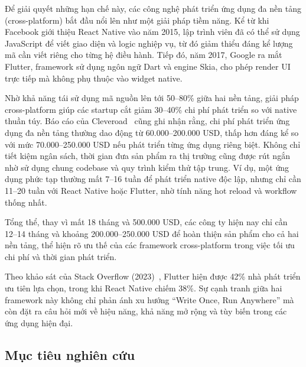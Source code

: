     Để giải quyết những hạn chế này, các công nghệ phát triển ứng dụng đa nền tảng (cross-platform) bắt đầu nổi lên như một giải pháp tiềm năng. Kể từ khi Facebook giới thiệu React Native vào năm 2015, lập trình viên đã có thể sử dụng JavaScript để viết giao diện và logic nghiệp vụ, từ đó giảm thiểu đáng kể lượng mã cần viết riêng cho từng hệ điều hành. Tiếp đó, năm 2017, Google ra mắt Flutter, framework sử dụng ngôn ngữ Dart và engine Skia, cho phép render UI trực tiếp mà không phụ thuộc vào widget native.
\vspace{0.5em}


    Nhờ khả năng tái sử dụng mã nguồn lên tới 50--80\% giữa hai nền tảng, giải pháp cross-platform giúp các startup cắt giảm 30--40\% chi phí phát triển so với native thuần túy. Báo cáo của Cleveroad~\cite{cleveroad} cũng ghi nhận rằng, chi phí phát triển ứng dụng đa nền tảng thường dao động từ 60.000--200.000 USD, thấp hơn đáng kể so với mức 70.000--250.000 USD nếu phát triển từng ứng dụng riêng biệt. Không chỉ tiết kiệm ngân sách, thời gian đưa sản phẩm ra thị trường cũng được rút ngắn nhờ sử dụng chung codebase và quy trình kiểm thử tập trung. Ví dụ, một ứng dụng phức tạp thường mất 7--16 tuần để phát triển native độc lập, nhưng chỉ cần 11--20 tuần với React Native hoặc Flutter, nhờ tính năng hot reload và workflow thống nhất.
\vspace{0.5em}


    Tổng thể, thay vì mất 18 tháng và 500.000 USD, các công ty hiện nay chỉ cần 12--14 tháng và khoảng 200.000--250.000 USD để hoàn thiện sản phẩm cho cả hai nền tảng, thể hiện rõ ưu thế của các framework cross-platform trong việc tối ưu chi phí và thời gian phát triển.
\vspace{0.5em}


    Theo khảo sát của Stack Overflow (2023)~\cite{stackoverflow2023}, Flutter hiện được 42\% nhà phát triển ưu tiên lựa chọn, trong khi React Native chiếm 38\%. Sự cạnh tranh giữa hai framework này không chỉ phản ánh xu hướng ``Write Once, Run Anywhere'' mà còn đặt ra câu hỏi mới về hiệu năng, khả năng mở rộng và tùy biến trong các ứng dụng hiện đại.


\subsection{Mục tiêu nghiên cứu}
\renewcommand{\labelitemi}{--}    

